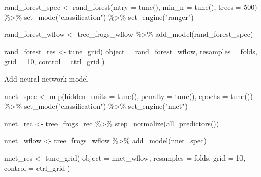 \documentclass[
]{book}
\newenvironment{Shaded}{\begin{snugshade}}{\end{snugshade}}
\newcommand{\AttributeTok}[1]{\textcolor[rgb]{0.77,0.63,0.00}{#1}}
\newcommand{\DecValTok}[1]{\textcolor[rgb]{0.00,0.00,0.81}{#1}}
\newcommand{\FunctionTok}[1]{\textcolor[rgb]{0.00,0.00,0.00}{#1}}
\newcommand{\NormalTok}[1]{#1}
\newcommand{\OtherTok}[1]{\textcolor[rgb]{0.56,0.35,0.01}{#1}}
\newcommand{\SpecialCharTok}[1]{\textcolor[rgb]{0.00,0.00,0.00}{#1}}
\newcommand{\StringTok}[1]{\textcolor[rgb]{0.31,0.60,0.02}{#1}}
\begin{document}
\begin{Shaded}
\begin{Highlighting}[]
\NormalTok{rand\_forest\_spec }\OtherTok{\textless{}{-}}
    \FunctionTok{rand\_forest}\NormalTok{(}\AttributeTok{mtry =} \FunctionTok{tune}\NormalTok{(),}
                \AttributeTok{min\_n =} \FunctionTok{tune}\NormalTok{(),}
                \AttributeTok{trees =} \DecValTok{500}\NormalTok{) }\SpecialCharTok{\%\textgreater{}\%}
    \FunctionTok{set\_mode}\NormalTok{(}\StringTok{"classification"}\NormalTok{) }\SpecialCharTok{\%\textgreater{}\%}
    \FunctionTok{set\_engine}\NormalTok{(}\StringTok{"ranger"}\NormalTok{)}

\NormalTok{rand\_forest\_wflow }\OtherTok{\textless{}{-}}
\NormalTok{    tree\_frogs\_wflow }\SpecialCharTok{\%\textgreater{}\%}
    \FunctionTok{add\_model}\NormalTok{(rand\_forest\_spec)}

\NormalTok{rand\_forest\_res }\OtherTok{\textless{}{-}}
    \FunctionTok{tune\_grid}\NormalTok{(}
        \AttributeTok{object =}\NormalTok{ rand\_forest\_wflow,}
        \AttributeTok{resamples =}\NormalTok{ folds,}
        \AttributeTok{grid =} \DecValTok{10}\NormalTok{,}
        \AttributeTok{control =}\NormalTok{ ctrl\_grid}
\NormalTok{    )}
\end{Highlighting}
\end{Shaded}

Add neural network model

\begin{Shaded}
\begin{Highlighting}[]
\NormalTok{nnet\_spec }\OtherTok{\textless{}{-}}
    \FunctionTok{mlp}\NormalTok{(}\AttributeTok{hidden\_units =} \FunctionTok{tune}\NormalTok{(),}
        \AttributeTok{penalty =} \FunctionTok{tune}\NormalTok{(),}
        \AttributeTok{epochs =} \FunctionTok{tune}\NormalTok{()) }\SpecialCharTok{\%\textgreater{}\%}
    \FunctionTok{set\_mode}\NormalTok{(}\StringTok{"classification"}\NormalTok{) }\SpecialCharTok{\%\textgreater{}\%}
    \FunctionTok{set\_engine}\NormalTok{(}\StringTok{"nnet"}\NormalTok{)}

\NormalTok{nnet\_rec }\OtherTok{\textless{}{-}}
\NormalTok{    tree\_frogs\_rec }\SpecialCharTok{\%\textgreater{}\%}
    \FunctionTok{step\_normalize}\NormalTok{(}\FunctionTok{all\_predictors}\NormalTok{())}

\NormalTok{nnet\_wflow }\OtherTok{\textless{}{-}}
\NormalTok{    tree\_frogs\_wflow }\SpecialCharTok{\%\textgreater{}\%}
    \FunctionTok{add\_model}\NormalTok{(nnet\_spec)}

\NormalTok{nnet\_res }\OtherTok{\textless{}{-}}
    \FunctionTok{tune\_grid}\NormalTok{(}
        \AttributeTok{object =}\NormalTok{ nnet\_wflow,}
        \AttributeTok{resamples =}\NormalTok{ folds,}
        \AttributeTok{grid =} \DecValTok{10}\NormalTok{,}
        \AttributeTok{control =}\NormalTok{ ctrl\_grid}
\NormalTok{    )}
\end{Highlighting}
\end{Shaded}
\end{document}
